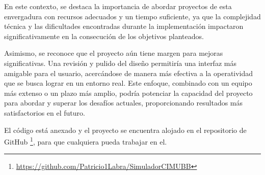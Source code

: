 En este contexto, se destaca la importancia de abordar proyectos de esta envergadura con recursos adecuados y un tiempo suficiente, ya que la complejidad técnica y las dificultades encontradas durante la implementación impactaron significativamente en la consecución de los objetivos planteados.

Asimismo, se reconoce que el proyecto aún tiene margen para mejoras significativas. Una revisión y pulido del diseño permitiría una interfaz más amigable para el usuario, acercándose de manera más efectiva a la operatividad que se busca lograr en un entorno real. Este enfoque, combinado con un equipo más extenso o un plazo más amplio, podría potenciar la capacidad del proyecto para abordar y superar los desafíos actuales, proporcionando resultados más satisfactorios en el futuro.

El código está anexado y el proyecto se encuentra alojado en el repositorio de GitHub \footnote{\url{https://github.com/Patricio1Labra/SimuladorCIMUBB}}, para que cualquiera pueda trabajar en el.